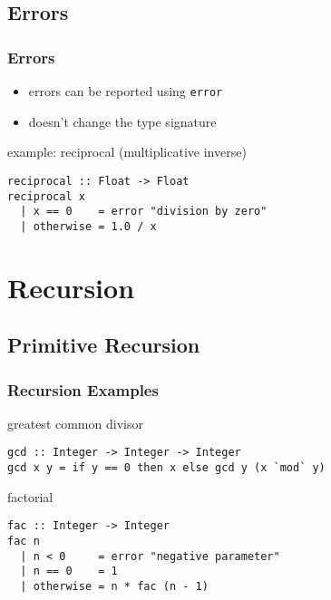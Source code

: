 \documentclass[dvipsnames]{beamer}
\theoremstyle{plain}
\begin{document}
\subsection{Errors}

\begin{frame}[fragile]
  \frametitle{Errors}

  \begin{itemize}
    \item errors can be reported using \lstinline|error|
    \item doesn't change the type signature
  \end{itemize}

  \begin{exampleblock}{example: reciprocal (multiplicative inverse)}
    \begin{lstlisting}
reciprocal :: Float -> Float
reciprocal x
  | x == 0    = error "division by zero"
  | otherwise = 1.0 / x
    \end{lstlisting}
  \end{exampleblock}
\end{frame}

\section{Recursion}


\subsection{Primitive Recursion}

\begin{frame}[fragile]
  \frametitle{Recursion Examples}

  \begin{exampleblock}{greatest common divisor}
    \begin{lstlisting}
gcd :: Integer -> Integer -> Integer
gcd x y = if y == 0 then x else gcd y (x `mod` y)
    \end{lstlisting}
  \end{exampleblock}

  \pause
  \begin{exampleblock}{factorial}
    \begin{lstlisting}
fac :: Integer -> Integer
fac n
  | n < 0     = error "negative parameter"
  | n == 0    = 1
  | otherwise = n * fac (n - 1)
    \end{lstlisting}
  \end{exampleblock}
\end{frame}
\end{document}
